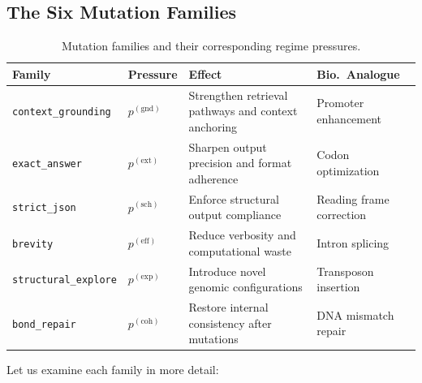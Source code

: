 \subsection{The Six Mutation Families}

\begin{table}[H]
\centering
\caption{Mutation families and their corresponding regime pressures.}
\label{tab:mutation-families}
\begin{tabularx}{\textwidth}{l l Y l}
\toprule
\textbf{Family} & \textbf{Pressure} & \textbf{Effect} & \textbf{Bio.\ Analogue} \\
\midrule
\texttt{context\_grounding} & $p^{(\text{gnd})}$ & Strengthen retrieval pathways and context anchoring & Promoter enhancement \\
\texttt{exact\_answer} & $p^{(\text{ext})}$ & Sharpen output precision and format adherence & Codon optimization \\
\texttt{strict\_json} & $p^{(\text{sch})}$ & Enforce structural output compliance & Reading frame correction \\
\texttt{brevity} & $p^{(\text{eff})}$ & Reduce verbosity and computational waste & Intron splicing \\
\texttt{structural\_explore} & $p^{(\text{exp})}$ & Introduce novel genomic configurations & Transposon insertion \\
\texttt{bond\_repair} & $p^{(\text{coh})}$ & Restore internal consistency after mutations & DNA mismatch repair \\
\bottomrule
\end{tabularx}
\end{table}

Let us examine each family in more detail:

